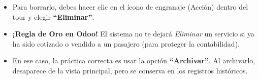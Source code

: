 \begin{itemize}
    \item Para borrarlo, debes hacer clic en el ícono de engranaje (Acción) dentro del tour y elegir \textbf{``Eliminar''}.
    \item \textbf{¡Regla de Oro en Odoo!} El sistema no te dejará \textit{Eliminar} un servicio si ya ha sido cotizado o vendido a un pasajero (para proteger la contabilidad). 
    \item En ese caso, la práctica correcta es usar la opción \textbf{``Archivar''}. Al archivarlo, desaparece de la vista principal, pero se conserva en los registros históricos.
\end{itemize}
